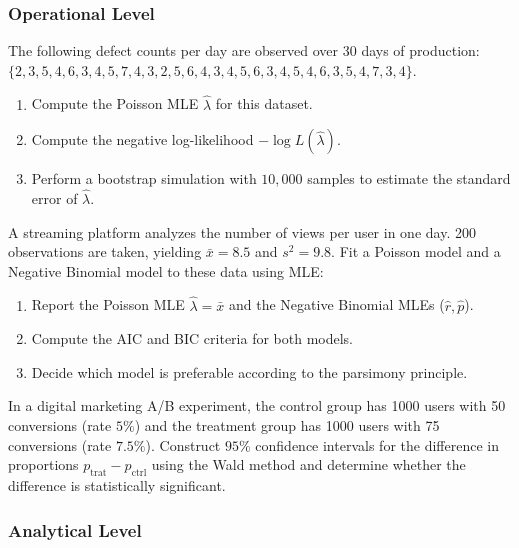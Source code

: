 \subsubsection*{Operational Level}

\begin{problema}
	\label{prob:3.10.4}
	The following defect counts per day are observed over 30 days of production: $\{2, 3, 5, 4, 6, 3, 4, 5, 7, 4, 3, 2, 5, 6, 4, 3, 4, 5, 6, 3, 4, 5, 4, 6, 3, 5, 4, 7, 3, 4\}$.
	\begin{enumerate}
		\item Compute the Poisson MLE $\hat{\lambda}$ for this dataset.
		\item Compute the negative log-likelihood $-\log L(\hat{\lambda})$.
		\item Perform a bootstrap simulation with $10{,}000$ samples to estimate the standard error of $\hat{\lambda}$.
	\end{enumerate}
\end{problema}

\begin{problema}
	\label{prob:3.10.5}
	A streaming platform analyzes the number of views per user in one day. 200 observations are taken, yielding $\bar{x} = 8.5$ and $s^{2} = 9.8$. Fit a Poisson model and a Negative Binomial model to these data using MLE:
	\begin{enumerate}
		\item Report the Poisson MLE $\hat{\lambda} = \bar{x}$ and the Negative Binomial MLEs ($\hat{r}, \hat{p}$).
		\item Compute the AIC and BIC criteria for both models.
		\item Decide which model is preferable according to the parsimony principle.
	\end{enumerate}
\end{problema}

\begin{problema}
	\label{prob:3.10.6}
	In a digital marketing A/B experiment, the control group has 1000 users with 50 conversions (rate $5\%$) and the treatment group has 1000 users with 75 conversions (rate $7.5\%$). Construct $95\%$ confidence intervals for the difference in proportions $p_{\text{trat}} - p_{\text{ctrl}}$ using the Wald method and determine whether the difference is statistically significant.
\end{problema}

\subsubsection*{Analytical Level}

